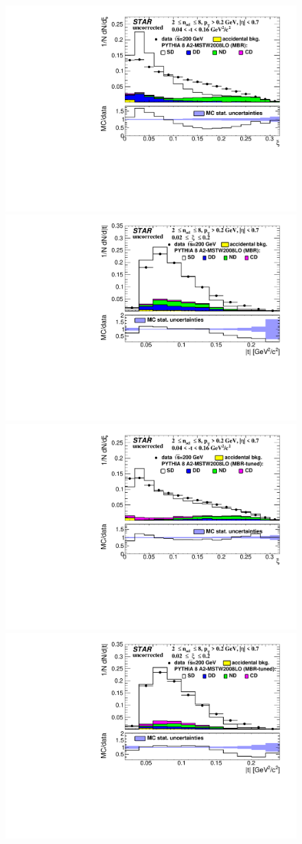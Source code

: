 \thispagestyle{empty}
\begin{figure}[h!]
	\centering
	\includegraphics[width=.49\textwidth,page=1]{chapters/chrgSTAR/img/nonSD/SDT_pythia_xi0_RP_starsim_xi.pdf}
	\hfill
	\includegraphics[width=.49\textwidth,page=1]{chapters/chrgSTAR/img/nonSD/SDT_pythia_xi0_RP_starsim_t.pdf}
	\newline
	\includegraphics[width=.49\textwidth,page=1]{chapters/chrgSTAR/img/nonSD/SDT_pythia_xi0_option2_RP_starsim_xi.pdf}
	\hfill
	\includegraphics[width=.49\textwidth,page=1]{chapters/chrgSTAR/img/nonSD/SDT_pythia_xi0_option2_RP_starsim_t.pdf}
	\newline

\end{figure}

